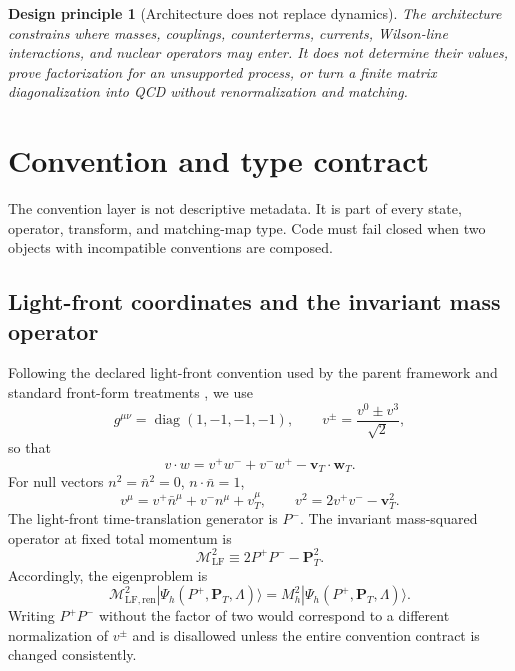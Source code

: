 \documentclass[11pt]{article}
\newtheorem{principle}[definition]{Design principle}
\newcommand{\LF}{\mathrm{LF}}
\newcommand{\cM}{\mathcal M}
\begin{document}
\begin{principle}[Architecture does not replace dynamics]
The architecture constrains where masses, couplings, counterterms, currents,
Wilson-line interactions, and nuclear operators may enter.  It does not
determine their values, prove factorization for an unsupported process, or
turn a finite matrix diagonalization into QCD without renormalization and
matching.
\end{principle}

\section{Convention and type contract}
\label{sec:conventions}

The convention layer is not descriptive metadata.  It is part of every state,
operator, transform, and matching-map type.  Code must fail closed when two
objects with incompatible conventions are composed.

\subsection{Light-front coordinates and the invariant mass operator}

Following the declared light-front convention used by the parent framework and standard front-form treatments \cite{Dirac1949,Brodsky1998,Vary2009}, we use
\begin{equation}
 g^{\mu\nu}=\operatorname{diag}(1,-1,-1,-1),
 \qquad
 v^{\pm}=\frac{v^0\pm v^3}{\sqrt2},
\label{eq:lf-components}
\end{equation}
so that
\begin{equation}
 v\cdot w=v^+w^-+v^-w^+-\bm v_T\cdot\bm w_T.
\label{eq:lf-dot-product}
\end{equation}
For null vectors \(n^2=\bar n^2=0\), \(n\cdot\bar n=1\),
\begin{equation}
 v^\mu=v^+\bar n^\mu+v^-n^\mu+v_T^\mu,
 \qquad
 v^2=2v^+v^- -\bm v_T^2.
\label{eq:lf-decomposition}
\end{equation}
The light-front time-translation generator is \(P^-\).  The invariant
mass-squared operator at fixed total momentum is
\begin{equation}
 \cM_{\LF}^2
 \equiv 2P^+P^- -\bm P_T^2.
\label{eq:lf-mass-operator}
\end{equation}
Accordingly, the eigenproblem is
\begin{equation}
 \cM_{\LF,\mathrm{ren}}^2
 |\Psi_h(P^+,\bm P_T,\Lambda)\rangle
 =M_h^2|\Psi_h(P^+,\bm P_T,\Lambda)\rangle.
\label{eq:lf-eigenproblem}
\end{equation}
Writing \(P^+P^-\) without the factor of two would correspond to a different
normalization of \(v^\pm\) and is disallowed unless the entire convention
contract is changed consistently.
\end{document}
